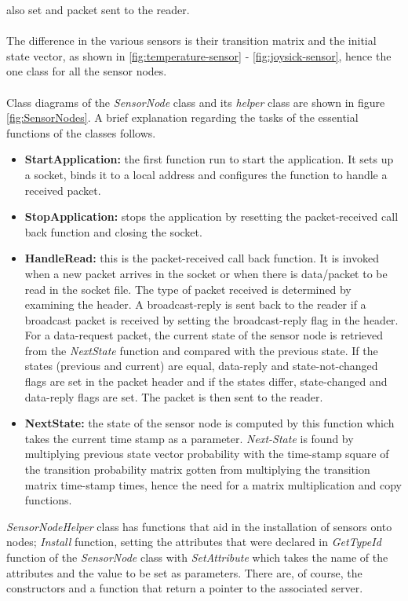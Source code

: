 also set and packet sent to the reader.\\\\
The difference in the various sensors is their transition matrix and the initial
state vector, as shown in \ref{fig:temperature-sensor} - \ref{fig:joysick-sensor},
hence the one class for all the sensor nodes.\\\\
Class diagrams of the \textit{SensorNode} class and its \textit{helper} class are
shown in figure \ref{fig:SensorNodes}. A brief explanation regarding the tasks of
the essential functions of the classes follows.
\begin{itemize}
\renewcommand{\labelitemi}{}
\item \textbf{StartApplication:} the first function run to start the application.
    It sets up a socket, binds it to a local address and configures the function
    to handle a received packet.
\item \textbf{StopApplication:} stops the application by resetting the
    packet-received call back function and closing the socket.
\item \textbf{HandleRead:} this is the packet-received call back function. It is
    invoked when a new packet arrives in the socket or when there is data/packet
    to be read in the socket file. The type of packet received is determined by
    examining the header. A broadcast-reply is sent back to the reader if a broadcast
    packet is received by setting the broadcast-reply flag in the header. For a
    data-request packet, the current state of the sensor node is retrieved from the
    \textit{NextState} function and compared with the previous state. If the states
    (previous and current) are equal, data-reply and state-not-changed flags are set
    in the packet header and if the states differ, state-changed and data-reply
    flags are set. The packet is then sent to the reader.
\item \textbf{NextState:} the state of the sensor node is computed by this function
    which takes the current time stamp as a parameter. \textit{Next-State} is found
    by multiplying previous state vector probability with the time-stamp square of
    the transition probability matrix gotten from multiplying the transition matrix
    time-stamp times, hence the need for a matrix multiplication and copy functions.
\end{itemize}
\textit{SensorNodeHelper} class has functions that aid in the installation of sensors
onto nodes; \textit{Install} function, setting the attributes that were declared in
\textit{GetTypeId} function of the \textit{SensorNode} class with \textit{SetAttribute}
which takes the name of the attributes and the value to be set as parameters. There are,
of course, the constructors and a function that return a pointer to the associated
server.

